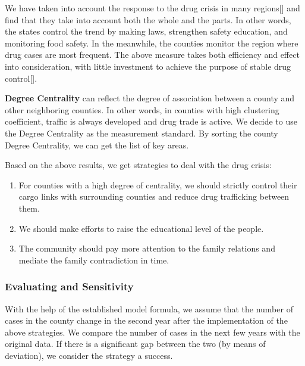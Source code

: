 \documentclass{mcmthesis}
\begin{document}
We have taken into account the response to the drug crisis in many regions[\cite{9}] and find that they take into account both the whole and the parts. In other words, the states control the trend by making laws, strengthen safety education, and monitoring food safety. In the meanwhile, the counties monitor the region where drug cases are most frequent. The above measure takes both efficiency and effect into consideration, with little investment to achieve the purpose of stable drug control[\cite{10}].

\textbf{Degree Centrality} can reflect the degree of association between a county and other neighboring counties. In other words, in counties with high clustering coefficient, traffic is always developed and drug trade is active. We decide to use the Degree Centrality as the measurement standard. By sorting the county Degree Centrality, we can get the list of key areas.

Based on the above results, we get strategies to deal with the drug crisis:

\begin{enumerate}
	\item For counties with a high degree of centrality, we should strictly control their cargo links with surrounding counties and reduce drug trafficking between them.
	\item We should make efforts to raise the educational level of the people.
	\item The community should pay more attention to the family relations and mediate the family contradiction in time.
\end{enumerate}

\subsubsection{Evaluating and Sensitivity}
With the help of the established model formula, we assume that the number of cases in the county change in the second year after the implementation of the above strategies. We compare the number of cases in the next few years with the original data. If there is a significant gap between the two (by means of deviation), we consider the strategy a success.
\end{document}
